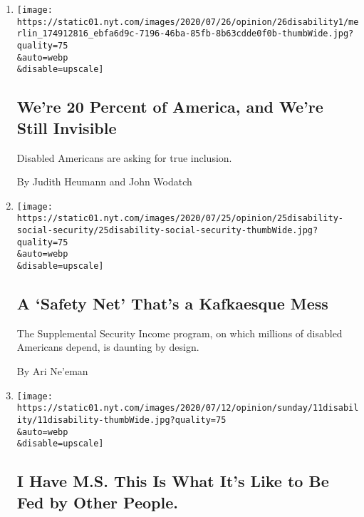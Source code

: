 \begin{enumerate}
\def\labelenumi{\arabic{enumi}.}
\item
  \href{/2020/07/26/opinion/Americans-with-disabilities-act.html}{}

  \texttt{[image: https://static01.nyt.com/images/2020/07/26/opinion/26disability1/merlin\_174912816\_ebfa6d9c-7196-46ba-85fb-8b63cdde0f0b-thumbWide.jpg?quality=75\\\&auto=webp\\\&disable=upscale]}

  \hypertarget{were-20-percent-of-america-and-were-still-invisible}{%
  \subsection{We're 20 Percent of America, and We're Still
  Invisible}\label{were-20-percent-of-america-and-were-still-invisible}}

  Disabled Americans are asking for true inclusion.

  By Judith Heumann and John Wodatch
\item
  \href{/2020/07/25/opinion/a-safety-net-thats-a-kafkaesque-mess.html}{}

  \texttt{[image: https://static01.nyt.com/images/2020/07/25/opinion/25disability-social-security/25disability-social-security-thumbWide.jpg?quality=75\\\&auto=webp\\\&disable=upscale]}

  \hypertarget{a-safety-net-thats-a-kafkaesque-mess}{%
  \subsection{A `Safety Net' That's a Kafkaesque
  Mess}\label{a-safety-net-thats-a-kafkaesque-mess}}

  The Supplemental Security Income program, on which millions of
  disabled Americans depend, is daunting by design.

  By Ari Ne'eman
\item
  \href{/2020/07/10/opinion/sunday/ms-disability-food-eating.html}{}

  \texttt{[image: https://static01.nyt.com/images/2020/07/12/opinion/sunday/11disability/11disability-thumbWide.jpg?quality=75\\\&auto=webp\\\&disable=upscale]}

  \hypertarget{i-have-ms-this-is-what-its-like-to-be-fed-by-other-people}{%
  \subsection{I Have M.S. This Is What It's Like to Be Fed by Other
  People.}\label{i-have-ms-this-is-what-its-like-to-be-fed-by-other-people}}


\end{enumerate}
